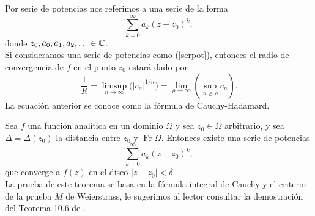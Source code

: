Por serie de potencias nos referimos a una serie de la forma
\begin{equation}\label{serpot}
	\sum_{k=0}^{\infty}a_k(z-z_0)^{k},
\end{equation}
donde $z_0,a_0,a_1,a_2,\ldots\in \mathbb{C}$.\\
Si consideramos una serie de potencias como (\ref{serpot}), entonces el radio de convergencia de $f$ en el punto $z_0$ estará dado por
\begin{equation}
	{\displaystyle {\frac {1}{R}}=\limsup _{n\to \infty }{\big (}|c_{n}|^{1/n}{\big )}} =\lim_{\rho\rightarrow\infty}\left(\sup_{n\geq \rho}c_n\right).
\end{equation} 
La ecuación anterior se conoce como la fórmula de Cauchy-Hadamard.
\begin{teor}\label{TeorExpA}
	Sea $f$ una función analítica en un dominio $\Omega$ y sea $z_0\in \Omega$ arbitrario, y sea $\Delta=\Delta(z_0)$ la distancia entre $z_0$ y $\operatorname{Fr }\Omega$. Entonces existe una serie de potencias  
	$$\sum_{k=0}^{\infty}a_k(z-z_0)^{k},$$
	que converge a $f(z)$ en el disco $|z-z_0|<\delta$.\\
	La prueba de este teorema se basa en la fórmula integral de Cauchy y el criterio de la prueba $M$ de  Weierstrass, le sugerimos al lector consultar la demostración del Teorema 10.6 de \cite{silverman}.
\end{teor}
